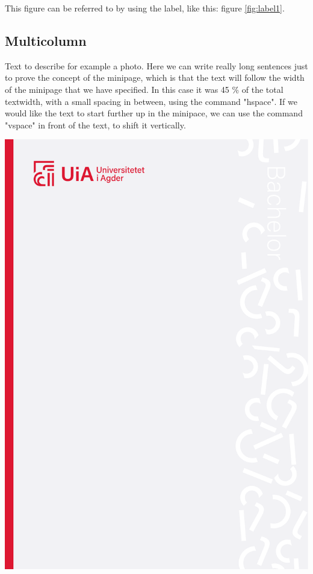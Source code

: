 This figure can be referred to by using the label, like this: figure \ref{fig:label1}.


\subsection{Multicolumn}

\begin{minipage}{0.45\textwidth}

    \vspace{-4cm}
    Text to describe for example a photo. Here we can write really long sentences just to prove the concept of the minipage, which is that the text will follow the width of the minipage that we have specified. In this case it was 45 \% of the total textwidth, with a small spacing in between, using the command "hspace". If we would like the text to start further up in the minipace, we can use the command "vspace" in front of the text, to shift it vertically.

\end{minipage}
\hspace{0.05\textwidth}
\begin{minipage}{0.45\textwidth}
 
    \includegraphics[width = \textwidth]{Figures/Frontpage/forside_bachelor_nor.pdf}

\end{minipage}


